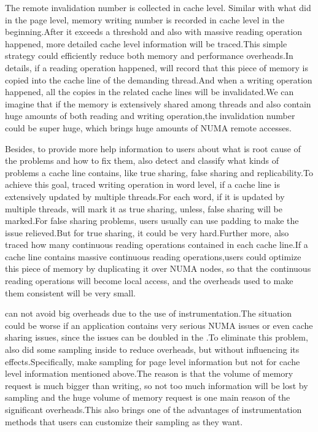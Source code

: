 The remote invalidation number is collected in cache level.
Similar with what \NP{} did in the page level, memory writing number is recorded in cache level in the beginning.After it exceeds a threshold and also with massive reading operation happened, more detailed cache level information will be traced.This simple strategy could efficiently reduce both memory and performance overheads.In details, if a reading operation happened, \NP{} will record that this piece of memory is copied into the cache line of the demanding thread.And when a writing operation happened, all the copies in the related cache lines will be invalidated.We can imagine that if the memory is extensively shared among threads and also contain huge amounts of both reading and writing operation,the invalidation number could be super huge, which brings huge amounts of NUMA remote accesses. 

Besides, to provide more help information to users about what is root cause of the problems and how to fix them, \NP{} also detect and classify what kinds of problems a cache line contains, like true sharing, false sharing and replicability.To achieve this goal, \NP{} traced writing operation in word level, if a cache line is extensively updated by multiple threads.For each word, if it is updated by multiple threads, \NP{} will mark it as true sharing, unless, false sharing will be marked.For false sharing problems, users usually can use padding to make the issue relieved.But for true sharing, it could be very hard.Further more, \NP{} also traced how many continuous reading operations contained in each cache line.If a cache line contains massive continuous reading operations,users could optimize this piece of memory by duplicating it over NUMA nodes, so that the continuous reading operations will become local access, and the overheads used to make them consistent will be very small.

\NP{} can not avoid big overheads due to the use of instrumentation.The situation could be worse if an application contains very serious NUMA issues or even cache sharing issues, since the issues can be doubled in the \NP{}.To eliminate this problem, \NP{} also did some sampling inside to reduce overheads, but without influencing its effects.Specifically, \NP{} make sampling for page level information but not for cache level information mentioned above.The reason is that the volume of memory request is much bigger than writing, so not too much information will be lost by sampling and the huge volume of memory request is one main reason of the significant overheads.This also brings one of the advantages of instrumentation methods that users can customize their sampling as they want.

